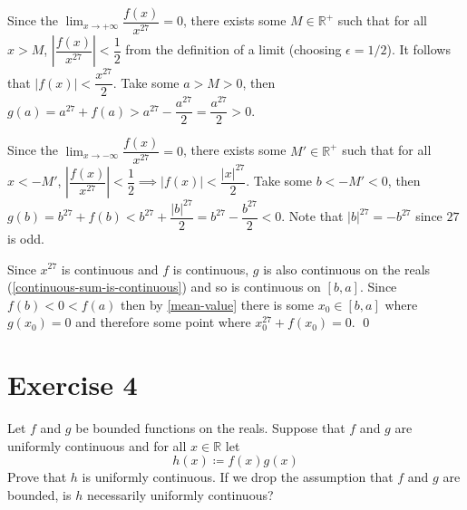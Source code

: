 \documentclass{article}
\begin{document}
Since the $\lim_{x \to +\infty}\dfrac{f(x)}{x^{27}}=0$, there exists some $M \in \mathbb{R^+}$ such that
for all $x > M$, $\left| \dfrac{f(x)}{x^{27}}\right|<\dfrac{1}{2}$ from the definition of a limit (choosing $\epsilon=1/2$). It follows that
$|f(x)| < \dfrac{x^{27}}{2}$. Take some $a>M>0$, then $g(a)=a^{27}+f(a) > a^{27}-\dfrac{a^{27}}{2}=\dfrac{a^{27}}{2}>0$.

Since the $\lim_{x \to -\infty}\dfrac{f(x)}{x^{27}}=0$, there exists some $M' \in \mathbb{R^+}$ such that for all
$x < -M'$, $\left| \dfrac{f(x)}{x^{27}}\right|<\dfrac{1}{2} \implies |f(x)|<\dfrac{|x|^{27}}{2}$.
Take some $b < -M' < 0$, then $g(b)=b^{27}+f(b) < b^{27}+\dfrac{|b|^{27}}{2}=b^{27}-\dfrac{b^{27}}{2}<0$. Note that $|b|^{27}=-b^{27}$ since $27$ is
odd.

Since $x^{27}$ is continuous and $f$ is continuous, $g$ is also continuous on the reals (\cref{continuous-sum-is-continuous})
and so is continuous on $[b,a]$. Since $f(b)<0<f(a)$ then by
\cref{mean-value} there is some $x_0 \in [b,a]$ where $g(x_0)=0$ and therefore some point where $x_0^{27}+f(x_0)=0$. \qed

\section{Exercise 4}
Let $f$ and $g$ be bounded functions on the reals. Suppose that $f$ and $g$ are uniformly continuous and for all $x \in \mathbb{R}$ let
\begin{equation}
	h(x) \coloneq f(x)g(x)
\end{equation}
Prove that $h$ is uniformly continuous. If we drop the assumption that $f$ and $g$ are bounded, is $h$ necessarily uniformly continuous?
\end{document}
